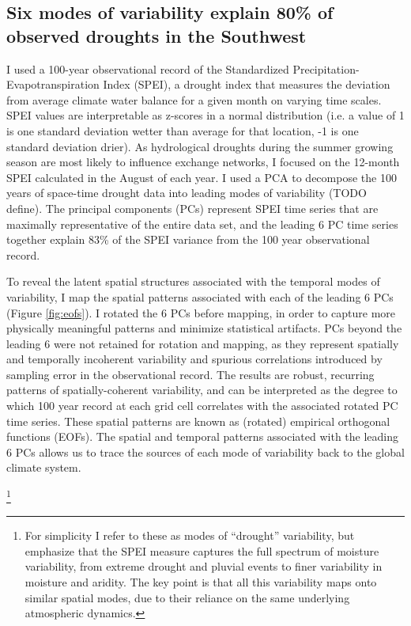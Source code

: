 \documentclass[11pt]{wlscirep}
\begin{document}
\subsection*{Six modes of variability explain 80\% of observed droughts in the Southwest}
I used a 100-year observational record of the Standardized Precipitation-Evapotranspiration Index (SPEI), a drought index that measures the deviation from average climate water balance for a given month on varying time scales. SPEI values are interpretable as z-scores in a normal distribution (i.e. a value of 1 is one standard deviation wetter than average for that location, -1 is one standard deviation drier). As hydrological droughts during the summer growing season are most likely to influence exchange networks, I focused on the 12-month SPEI calculated in the August of each year. I used a PCA to decompose the 100 years of space-time drought data into leading modes of variability (TODO define). The principal components (PCs) represent SPEI time series that are maximally representative of the entire data set, and the leading 6 PC time series together explain 83\% of the SPEI variance from the 100 year observational record. 

To reveal the latent spatial structures associated with the temporal modes of variability, I map the spatial patterns associated with each of the leading 6 PCs (Figure \ref{fig:eofs}). I rotated the 6 PCs before mapping, in order to capture more physically meaningful patterns and minimize statistical artifacts. PCs beyond the leading 6 were not retained for rotation and mapping, as they represent spatially and temporally incoherent variability and spurious correlations introduced by sampling error in the observational record. The results are robust, recurring patterns of spatially-coherent variability, and can be interpreted as the degree to which 100 year record at each grid cell correlates with the associated rotated PC time series. These spatial patterns are known as (rotated) empirical orthogonal functions (EOFs). The spatial and temporal patterns associated with the leading 6 PCs allows us to trace the sources of each mode of variability back to the global climate system.

\footnote{For simplicity I refer to these as modes of ``drought'' variability, but emphasize that the SPEI measure captures the full spectrum of moisture variability, from extreme drought and pluvial events to finer variability in moisture and aridity. The key point is that all this variability maps onto similar spatial modes, due to their reliance on the same underlying atmospheric dynamics.}
\end{document}
